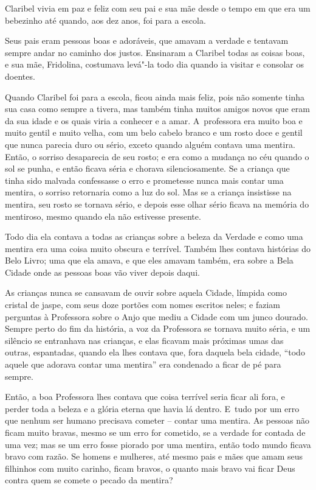  

Claribel vivia em paz e feliz com seu pai e sua mãe desde o tempo em que
era um bebezinho até quando, aos dez anos, foi para a escola.

Seus pais eram pessoas boas e adoráveis, que amavam a verdade e tentavam
sempre andar no caminho dos justos. Ensinaram a Claribel todas as
coisas boas, e sua mãe, Fridolina, costumava levá"-la todo dia quando ia
visitar e consolar os doentes.

Quando Claribel foi para a escola, ficou ainda mais feliz, pois não
somente tinha sua casa como sempre a tivera, mas também tinha muitos
amigos novos que eram da sua idade e os quais viria a conhecer e a amar.
A~professora era muito boa e muito gentil e muito velha, com um belo
cabelo branco e um rosto doce e gentil que nunca parecia duro ou sério,
exceto quando alguém contava uma mentira. Então, o sorriso desaparecia
de seu rosto; e era como a mudança no céu quando o sol se punha, e então
ficava séria e chorava silenciosamente. Se a criança que tinha sido
malvada confessasse o erro e prometesse nunca mais contar uma mentira, o
sorriso retornaria como a luz do sol. Mas se a criança insistisse na
mentira, seu rosto se tornava sério, e depois esse olhar sério ficava na
memória do mentiroso, mesmo quando ela não estivesse presente.

Todo dia ela contava a todas as crianças sobre a beleza da Verdade e como
uma mentira era uma coisa muito obscura e terrível. Também lhes
contava histórias do Belo Livro; uma que ela amava, e que eles amavam
também, era sobre a Bela Cidade onde as pessoas boas vão viver depois
daqui.

As crianças nunca se cansavam de ouvir sobre aquela Cidade, límpida como
cristal de jaspe, com seus doze portões com nomes escritos neles; e
faziam perguntas à Professora sobre o Anjo que mediu a Cidade com um
junco dourado. Sempre perto do fim da história, a voz da Professora se
tornava muito séria, e um silêncio se entranhava nas crianças, e elas
ficavam mais próximas umas das outras, espantadas, quando ela lhes contava
que, fora daquela bela cidade,
``todo aquele que adorava contar uma mentira'' era condenado a ficar de pé para sempre.

Então, a boa Professora lhes contava que coisa terrível seria ficar
ali fora, e perder toda a beleza e a glória eterna que havia lá dentro.
E~tudo por um erro que nenhum ser humano precisava cometer -- contar uma
mentira. As pessoas não ficam muito bravas, mesmo se um erro for
cometido, se a verdade for contada de uma vez; mas se um erro fosse
piorado por uma mentira, então todo mundo ficava bravo com razão. Se
homens e mulheres, até mesmo pais e mães que amam seus filhinhos com
muito carinho, ficam bravos, o quanto mais bravo vai ficar Deus contra
quem se comete o pecado da mentira?


